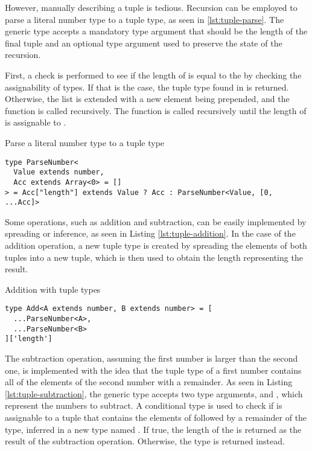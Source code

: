 However, manually describing a tuple is tedious. Recursion can be employed to parse a literal number type to a tuple type, as seen in \ref{lst:tuple-parse}. The  generic type accepts a mandatory type argument  that should be the length of the final tuple and an optional type argument  used to preserve the state of the recursion.

First, a check is performed to see if the length of  is equal to the  by checking the assignability of types. If that is the case, the tuple type found in  is returned. Otherwise, the list is extended with a new  element being prepended, and the function is called recursively. The function is called recursively until the length of  is assignable to .

\begin{listing}[ht]
\caption{Parse a literal number type to a tuple type}\label{lst:tuple-parse}
\begin{verbatim}
type ParseNumber<
  Value extends number,
  Acc extends Array<0> = []
> = Acc["length"] extends Value ? Acc : ParseNumber<Value, [0, ...Acc]>
\end{verbatim}
\end{listing}

Some operations, such as addition and subtraction, can be easily implemented by spreading or inference, as seen in Listing \ref{lst:tuple-addition}. In the case of the addition operation, a new tuple type is created by spreading the elements of both tuples into a new tuple, which is then used to obtain the length representing the result.

\begin{listing}[ht]
\caption{Addition with tuple types}\label{lst:tuple-addition}
\begin{verbatim}
type Add<A extends number, B extends number> = [
  ...ParseNumber<A>, 
  ...ParseNumber<B>
]['length']
\end{verbatim}
\end{listing}

The subtraction operation, assuming the first number is larger than the second one, is implemented with the idea that the tuple type of a first number contains all of the elements of the second number with a remainder. As seen in Listing \ref{lst:tuple-subtraction}, the  generic type accepts two type arguments,  and , which represent the numbers to subtract. A conditional type is used to check if  is assignable to a tuple that contains the elements of  followed by a remainder of the  type, inferred in a new type named . If true, the length of the  is returned as the result of the subtraction operation. Otherwise, the  type is returned instead.

